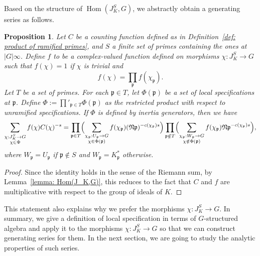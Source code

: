 \documentclass{amsart}
\numberwithin{equation}{section}
\theoremstyle{plain}
\newtheorem{proposition}[theorem]{Proposition}
\theoremstyle{definition}
\theoremstyle{remark}
\begin{document}
Based on the structure of $\operatorname{Hom}(J_K^S,G)$, we abstractly obtain a generating series as follows.
\begin{proposition}\label{prop: unique factorization of ideals}
    Let $C$ be a counting function defined as in Definition~\ref{def: product of ramified primes}, and $S$ a finite set of primes containing the ones at $\lvert G\rvert\infty$.
    Define $f$ to be a complex-valued function defined on morphisms $\chi:J_K^S\to G$ such that $f(\chi)=1$ if $\chi$ is trivial and
	\begin{equation*}
		f(\chi)=\prod_{\mathfrak{p}}f(\chi_{\mathfrak{p}}).
	\end{equation*}
    Let $T$ be a set of primes.
    For each $\mathfrak{p}\in T$, let $\Phi(\mathfrak{p})$ be a set of local specifications at $\mathfrak{p}$.
    Define $\Phi:=\prod'_{\mathfrak{p}\in T}\Phi(\mathfrak{p})$ as the restricted product with respect to unramified specifications.
    If $\Phi$ is defined by inertia generators, then we have
	\begin{equation*}
		\sum_{
			\substack{
				\chi:J_K^S\to G\\
				\chi\in\Phi
			}
		}f(\chi)C(\chi)^{-s}
		=\prod_{\mathfrak{p}\in T}
		\Bigl(
		\sum_{
			\substack{
				\chi_{\mathfrak{p}}:U_{\mathfrak{p}}\to G\\
				\chi\in\Phi(\mathfrak{p})
			}
		}
		f(\chi_{\mathfrak{p}})(\mathfrak{Np})^{-c(\chi_{\mathfrak{p}})s}
		\Bigr)
		\prod_{\mathfrak{p}\notin T}
		\Bigl(
		\sum_{
			\substack{
				\chi_{\mathfrak{p}}:W_{\mathfrak{p}}\to G\\
				\chi\notin\Phi(\mathfrak{p})
			}
		}f(\chi_{\mathfrak{p}})\mathfrak{Np}^{-c(\chi_{\mathfrak{p}})s}
		\Bigr)
		,
	\end{equation*}
	where $W_{\mathfrak{p}}=U_{\mathfrak{p}}$ if $\mathfrak{p}\notin S$ and $W_{\mathfrak{p}}=K_{\mathfrak{p}}^*$ otherwise.
\end{proposition}
\begin{proof}
	Since the identity holds in the sense of the Riemann sum, by Lemma~\ref{lemma: Hom(J_K,G)}, this reduces to the fact that $C$ and $f$ are multiplicative with respect to the group of ideals of $K$.
\end{proof}
This statement also explains why we prefer the morphisms $\chi:J_K^S\to G$.
In summary, we give a definition of local specification in terms of $G$-structured algebra and apply it to the morphisms $\chi:J_K^S\to G$ so that we can construct generating series for them.
In the next section, we are going to study the analytic properties of such series.
\end{document}
